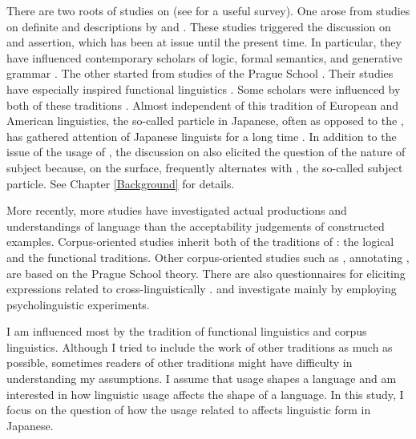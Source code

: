 There are two roots of studies on 
(see  for a useful survey).
One arose from studies on definite and  descriptions by  and .
These studies triggered the discussion on  and assertion,
which has been at issue until the present time.
In particular, they have influenced contemporary scholars of logic, formal semantics, and generative grammar \cite{chomsky65,jackendoff72,selkirk84,rooth85,rizzi97,erteschik-shir97,erteschik-shir07,buring07,ishihara11,krifkamusan12,endo14}.
The other started from studies of the Prague School \cite{mathesius28,mathesius29,sgall67,firbas75}.
Their studies have especially inspired functional linguistics
\cite{bolinger65,halliday67,kuno73,gundel74,chafe76,chafe94,prince81,givon83,tomlin86,lambrecht94,birnerward98,birnerward09}.
Some scholars were influenced by both of these traditions
\cite{vallduvi90,steedman91,vallduvivilkuna98}.%
Almost independent of this tradition of European and American linguistics,
the so-called  particle  in Japanese,
often as opposed to the  ,
has gathered attention of Japanese linguists for a long time \cite{matsushita28,yamada36,tokieda50,mikami53,mikami60,onoe81,kinsui95,kikuchi95,noda96,masuoka00,masuoka12}.
In addition to the issue of the usage of ,
the discussion on  also elicited the question of the nature of subject
because, on the surface,  frequently alternates with ,
the so-called subject particle.
See Chapter \ref{Background} for details.

More recently,
more studies have investigated actual productions and understandings of language than the acceptability judgements of constructed examples.
Corpus-oriented studies  
\cite[e.g.,][]{calhounetal05,gotzeetal07,chiarcosetal11}
inherit both of the traditions of :
the logical and the functional traditions.
Other corpus-oriented studies such as ,
annotating , are based on the Prague School theory.
There are also questionnaires for eliciting expressions related to  cross-linguistically \cite{skopeteasetal06}.
 and  investigate  mainly by employing psycholinguistic experiments.

I am influenced most by the tradition of functional linguistics and corpus linguistics.
Although I tried to include the work of other traditions as much as possible, sometimes readers of other traditions might have difficulty in understanding my assumptions.
I assume that usage shapes a language \cite{givon76,comrie83,comrie89,bybeehopper01} and
am interested in how linguistic usage affects the shape of a language.
In this study,
I focus on the question of how the usage related to  affects linguistic form in Japanese.


